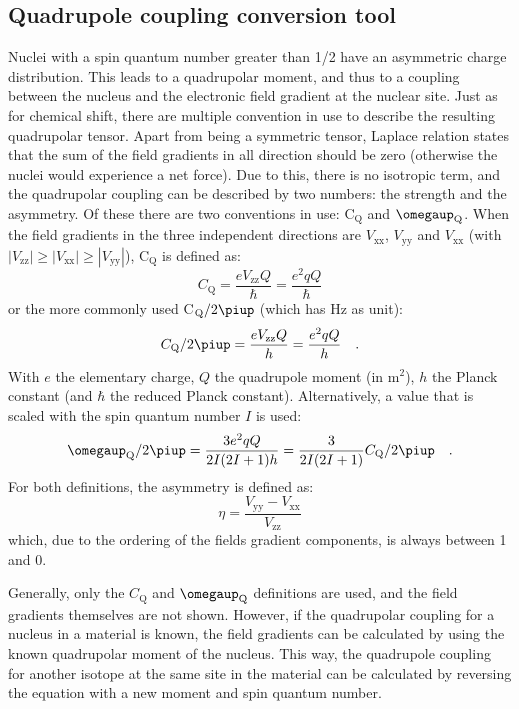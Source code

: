 \documentclass[11pt,a4paper]{article}
\begin{document}
\subsection{Quadrupole coupling conversion tool}
Nuclei with a spin quantum number greater than 1/2 have an asymmetric charge distribution. This leads to a quadrupolar moment, and thus to a coupling between the nucleus and the electronic field gradient at the nuclear site. Just as for chemical shift, there are multiple convention in use to describe the resulting quadrupolar tensor. Apart from being a symmetric tensor, Laplace relation states that the sum of the field gradients in all direction should be zero (otherwise the nuclei would experience a net force). Due to this, there is no isotropic term, and the quadrupolar coupling can be described by two numbers: the strength and the asymmetry. Of these there are two conventions in use: C$_\text{Q}$ and $\omegaup_\text{Q}$. When the field gradients in the three independent directions are $V_\text{xx}$, $V_\text{yy}$ and $V_\text{xx}$ (with $|V_\text{zz}| \geq |V_\text{xx}| \geq |V_\text{yy}|$), C$_\text{Q}$ is defined as:
\begin{equation}
C_\text{Q} = \dfrac{eV_\text{zz}Q}{\hbar} = \dfrac{e^2qQ}{\hbar}
\end{equation}
or the more commonly used C$_\text{Q}/2\piup$ (which has Hz as unit):
\begin{equation}
C_\text{Q}/2\piup = \dfrac{eV_\text{zz}Q}{h} = \dfrac{e^2qQ}{h} \quad .
\end{equation}
With $e$ the elementary charge, $Q$ the quadrupole moment (in m$^2$), $h$ the Planck constant (and $\hbar$ the reduced Planck constant). Alternatively, a value that is scaled with the spin quantum number $I$ is used:
\begin{equation}
\omegaup_\text{Q}/2\piup = \dfrac{3e^2qQ}{2I(2I+1)h} = \dfrac{3}{2I(2I+1)} C_\text{Q}/2\piup	\quad .
\end{equation}
For both definitions, the asymmetry is defined as:
\begin{equation}
\eta = \dfrac{V_\text{yy} -V_\text{xx}}{V_\text{zz}}
\end{equation}
which, due to the ordering of the fields gradient components, is always between 1 and 0.

Generally, only the $C_\text{Q}$ and $\omegaup_\text{Q}$ definitions are used, and the field gradients themselves are not shown. However, if the quadrupolar coupling for a nucleus in a material is known, the field gradients can be calculated by using the known quadrupolar moment of the nucleus. This way, the quadrupole coupling for another isotope at the same site in the material can be calculated by reversing the equation with a new moment and spin quantum number.
\end{document}
